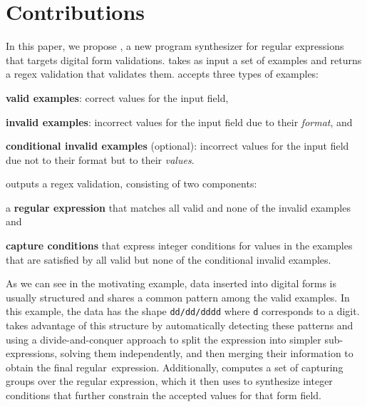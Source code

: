 \section{Contributions}

In this paper, we propose \Forest{}, a new program synthesizer for regular expressions that targets digital form validations.
\Forest takes as input a set of examples and returns a regex validation that validates them. %
%
\Forest accepts three types of examples:
\begin{enumerate*}[label=(\roman*)]
    \item \textbf{valid examples}: correct values for the input field, %
    \item \textbf{invalid examples}: incorrect values for the input field due to their \textit{format}, and
    \item \textbf{conditional invalid examples} (optional): incorrect values for the input field due not to their format but to their \textit{values}.
\end{enumerate*}
%
\Forest outputs a regex validation, consisting of two components:
\begin{enumerate*}[label=(\roman*)]
    \item a \textbf{regular expression} that matches all valid and none of the invalid examples and
    \item \textbf{capture conditions} that express integer conditions for values in the examples that are satisfied by all valid but none of the conditional invalid examples.
\end{enumerate*}

As we can see in the motivating example, data inserted into digital forms is usually structured and shares a common pattern among the valid examples.
In this example, the data has the shape \texttt{dd/dd/dddd} where \texttt{d} corresponds to a digit. 
\Forest takes advantage of this structure by automatically detecting these patterns and using a divide-and-conquer approach to split the expression into simpler sub-expressions, solving them independently, and then merging their information to obtain the final regular~expression.
Additionally, \Forest computes a set of capturing groups over the regular expression, which it then uses to synthesize integer conditions that further constrain the accepted values for that form field.

